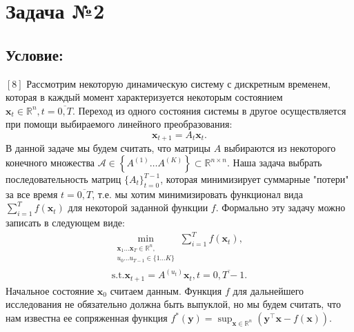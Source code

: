 \documentclass[a4paper,12pt]{article}
\begin{document}
\newpage
\section*{Задача №2}
\subsection*{Условие:}

$[8]$ Рассмотрим некоторую динамическую систему с дискретным временем, которая в каждый момент характеризуется некоторым состоянием $\mathbf{x}_t \in \mathbb{R}^n, t=\overline{0,T}.$ Переход из одного состояния системы в другое осуществляется при помощи выбираемого линейного преобразования:
        $$\mathbf{x}_{t+1}=A_t \mathbf{x}_t.$$
В данной задаче мы будем считать, что матрицы $A$ выбираются из некоторого конечного множества $\mathcal{A}\in\left\{A^{(1)}\dots A^{(K)}\right\}\subset \mathbb{R}^{n \times n}.$ Наша задача выбрать последовательность матриц $\{A_t\}_{t=0}^{T-1}$, которая минимизирует суммарные "потери" за все время $t=\overline{0,T}$, т.е. мы хотим минимизировать функционал вида $\sum\limits_{i=1}^T f(\mathbf{x}_t)$ для некоторой заданной функции $f.$ Формально эту задачу можно записать в следующем виде:
        \begin{equation}
        \label{control_problem}
        \begin{aligned}
      \min_{\substack{\mathbf{x}_1\dots\mathbf{x}_T \in\mathbb{R}^n,\\ u_0\dots u_{T-1} \in\{1\dots K\}}}\sum\limits_{i=1}^T f(\mathbf{x}_t),\\
              \text{s.t.} \mathbf{x}_{t+1}=A^{(u_t)}\mathbf{x}_{t}, t=\overline{0, T-1}.
        \end{aligned}
    \end{equation} 
Начальное состояние $\mathbf{x}_0$ считаем данным. Функция $f$ для дальнейшего исследования не обязательно должна быть выпуклой, но мы будем считать, что нам известна ее сопряженная функция $f^*(\mathbf{y})=\sup_{\mathbf{x}\in\mathbb{R}^n}\left(\mathbf{y}^\top \mathbf{x}-f(\mathbf{x})\right).$
\end{document}
